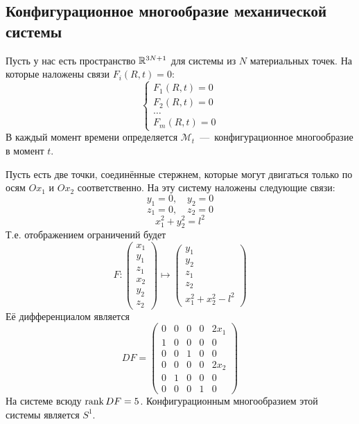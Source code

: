 \subsection{Конфигурационное многообразие механической системы}
\begin{definition}
    Пусть у нас есть пространство $\mathbb{R}^{3N + 1}$ для системы из $N$ материальных точек. На которые наложены связи $F_i(R, t) = 0$: \begin{equation*}
        \begin{cases}
            F_1(R, t) = 0 \\
            F_2(R, t) = 0 \\
            \ldots \\
            F_m(R, t) = 0 
        \end{cases}
    \end{equation*}
    В каждый момент времени определяется $\mathcal{M}_t$~---~конфигурационное многообразие в момент $t$.
\end{definition}
\begin{example}
    Пусть есть две точки, соединённые стержнем, которые могут двигаться только по осям $Ox_1$ и $Ox_2$  соответственно. На эту систему наложены следующие связи: \[
        y_1 = 0, \quad y_2 = 0
    \]
    \[
        z_1 = 0, \quad z_2 = 0
    \]
    \[
        x_1^2 + y_2^2 = l^2
    \]
    Т.е. отображением ограничений будет \[F: \begin{pmatrix}
        x_1 \\ y_1 \\ z_1 \\ x_2 \\ y_2 \\ z_2
    \end{pmatrix} \mapsto \begin{pmatrix}
        y_1 \\ y_2 \\ z_1 \\ z_2 \\ x_1^2 + x_2^2 - l^2
    \end{pmatrix}\]
    Её дифференциалом является \[
    DF = \begin{pmatrix}
        0 & 0 & 0 & 0 & 2x_1 \\
        1 & 0 & 0 & 0 & 0 \\
        0 & 0 & 1 & 0 & 0 \\
        0 & 0 & 0 & 0 & 2x_2 \\
        0 & 1 & 0 & 0 & 0 \\
        0 & 0 & 0 & 1 & 0
    \end{pmatrix}
    \]
    На системе всюду $\operatorname{rank} DF = 5$. Конфигурационным многообразием этой системы является $S^1$.
\end{example}
